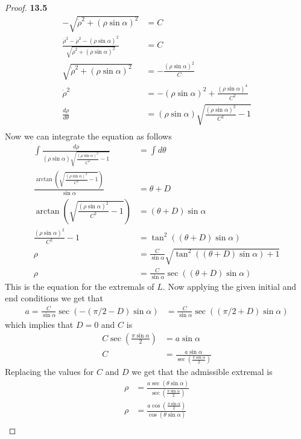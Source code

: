 \documentclass[11pt]{article}
\theoremstyle{definition}
\begin{document}
\begin{proof}{\textbf{13.5}}
\begin{align*}
        - \sqrt{\dot\rho^2 + (\rho\sin\alpha)^2} &= C\\
        \frac{\dot{\rho}^2 - \dot\rho^2 - (\rho\sin\alpha)^2}
        {\sqrt{\dot\rho^2 + (\rho\sin\alpha)^2}} &= C\\
        \sqrt{\dot\rho^2 + (\rho\sin\alpha)^2} &= -\frac{(\rho\sin\alpha)^2}{C}\\
        \dot\rho^2  &= - (\rho\sin\alpha)^2 + \frac{(\rho\sin\alpha)^4}{C^2}\\
        \frac{d\rho}{d\theta} &= (\rho\sin\alpha)\sqrt{\frac{(\rho\sin\alpha)^2}{C^2} - 1}\\
    \end{align*}
    Now  we can integrate the equation as follows
    \begin{align*}
        \int \frac{d\rho}{(\rho\sin\alpha)\sqrt{\frac{(\rho\sin\alpha)^2}{C^2} - 1}}
        &= \int d\theta\\
        \frac{\arctan(\sqrt{\frac{(\rho\sin\alpha)^2}{C^2} - 1})}{\sin\alpha}
        &= \theta + D\\
        \arctan(\sqrt{\frac{(\rho\sin\alpha)^2}{C^2} - 1})
        &= (\theta + D)\sin\alpha\\
        \frac{(\rho\sin\alpha)^2}{C^2} - 1
        &= \tan^2\left((\theta + D)\sin\alpha\right)\\
        \rho &= \frac{C}{\sin\alpha}
        \sqrt{\tan^2\left((\theta + D)\sin\alpha\right) + 1}\\
        \rho &= \frac{C}{\sin\alpha}\sec((\theta + D)\sin\alpha)
    \end{align*}
    This is the equation for the extremals of $L$.
    Now applying the given initial and end conditions we get that
    \begin{align*}
        a = \frac{C}{\sin\alpha}\sec(-(\pi/2 - D)\sin\alpha)
        &= \frac{C}{\sin\alpha}\sec((\pi/2 + D)\sin\alpha)
    \end{align*}
    which implies that $D = 0$ and $C$ is
    \begin{align*}
        C \sec\left(\frac{\pi\sin\alpha}{2}\right) &= a\sin\alpha\\
        C &= \frac{a\sin\alpha}{\sec\left(\frac{\pi\sin\alpha}{2}\right)}
    \end{align*}
    Replacing the values for $C$ and $D$ we get that the admissible extremal is
    \begin{align*}
        \rho &=
        \frac{a\sec(\theta\sin\alpha)}{\sec(\frac{\pi\sin\alpha}{2})}\\
        \rho &=
        \frac{a\cos(\frac{\pi\sin\alpha}{2})}{\cos(\theta\sin\alpha)}\\

\end{align*}
\end{proof}
\end{document}
